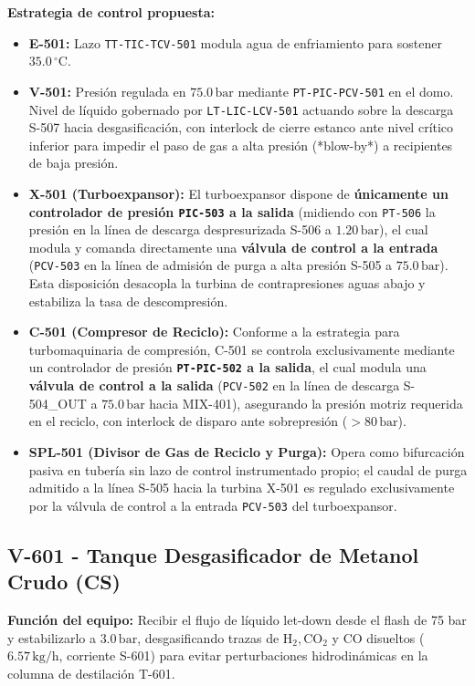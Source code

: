 \documentclass[10pt,letterpaper]{article}
\begin{document}
\textbf{Estrategia de control propuesta:}
\begin{itemize}
    \item \textbf{E-501:} Lazo \texttt{TT-TIC-TCV-501} modula agua de enfriamiento para sostener $35.0\,^\circ\text{C}$.
    \item \textbf{V-501:} Presión regulada en $75.0\,\text{bar}$ mediante \texttt{PT-PIC-PCV-501} en el domo. Nivel de líquido gobernado por \texttt{LT-LIC-LCV-501} actuando sobre la descarga S-507 hacia desgasificación, con interlock de cierre estanco ante nivel crítico inferior para impedir el paso de gas a alta presión (*blow-by*) a recipientes de baja presión.
    \item \textbf{X-501 (Turboexpansor):} El turboexpansor dispone de \textbf{únicamente un controlador de presión \texttt{PIC-503} a la salida} (midiendo con \texttt{PT-506} la presión en la línea de descarga despresurizada S-506 a $1.20\,\text{bar}$), el cual modula y comanda directamente una \textbf{válvula de control a la entrada} (\texttt{PCV-503} en la línea de admisión de purga a alta presión S-505 a $75.0\,\text{bar}$). Esta disposición desacopla la turbina de contrapresiones aguas abajo y estabiliza la tasa de descompresión.
    \item \textbf{C-501 (Compresor de Reciclo):} Conforme a la estrategia para turbomaquinaria de compresión, C-501 se controla exclusivamente mediante un controlador de presión \textbf{\texttt{PT-PIC-502} a la salida}, el cual modula una \textbf{válvula de control a la salida} (\texttt{PCV-502} en la línea de descarga S-504\_OUT a $75.0\,\text{bar}$ hacia MIX-401), asegurando la presión motriz requerida en el reciclo, con interlock de disparo ante sobrepresión ($>80\,\text{bar}$).
    \item \textbf{SPL-501 (Divisor de Gas de Reciclo y Purga):} Opera como bifurcación pasiva en tubería sin lazo de control instrumentado propio; el caudal de purga admitido a la línea S-505 hacia la turbina X-501 es regulado exclusivamente por la válvula de control a la entrada \texttt{PCV-503} del turboexpansor.
\end{itemize}

\subsection{V-601 - Tanque Desgasificador de Metanol Crudo (CS)}
\textbf{Función del equipo:} Recibir el flujo de líquido let-down desde el flash de 75 bar y estabilizarlo a $3.0\,\text{bar}$, desgasificando trazas de $\text{H}_2, \text{CO}_2$ y $\text{CO}$ disueltos ($6.57\,\text{kg/h}$, corriente S-601) para evitar perturbaciones hidrodinámicas en la columna de destilación T-601.
\end{document}

